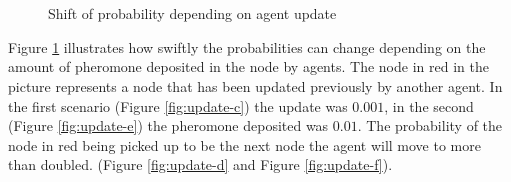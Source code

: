 \begin{figure}[H]
\myfloatalign
{} \quad
{} \\
 \quad
{} \\
 \quad
{}

\caption{Shift of probability depending on agent update}\label{fig:update}
\end{figure}

Figure \ref{fig:update} illustrates how swiftly the probabilities can change depending on the amount of pheromone deposited in the node by agents. The node in red in the picture represents a node that has been updated previously by another agent. In the first scenario (Figure \ref{fig:update-c}) the update was $0.001$, in the second (Figure \ref{fig:update-e}) the pheromone deposited was $0.01$. The probability of the node in red being picked up to be the next node the agent will move to more than doubled. (Figure \ref{fig:update-d} and Figure \ref{fig:update-f}).

